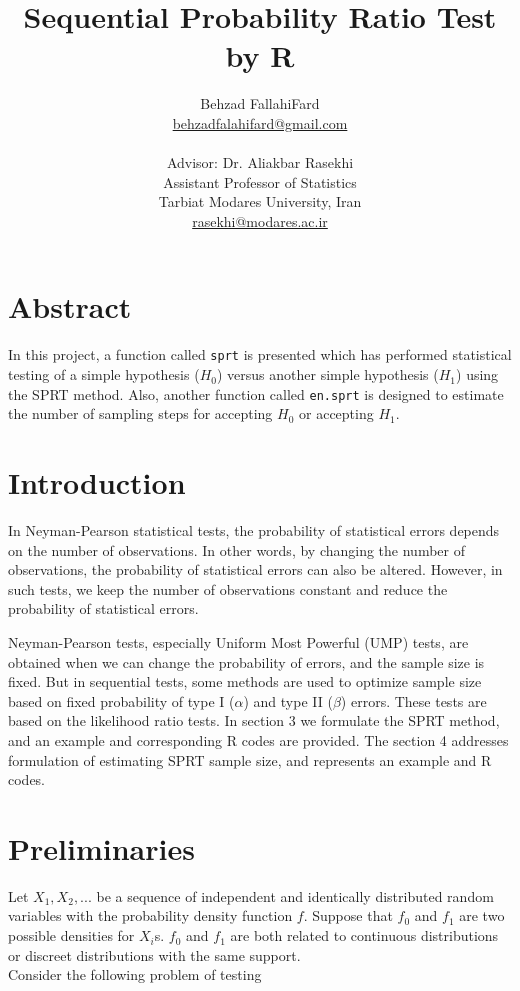 \documentclass{article}
\title{Sequential Probability Ratio Test by R}
\author{Behzad FallahiFard
\\ \href{mailto:behzadfalahifard@gmail.com}{behzadfalahifard@gmail.com}
\\ \\{\small Advisor: Dr. Aliakbar Rasekhi}\\ \small{Assistant Professor of Statistics}\\ {\small Tarbiat Modares University, Iran}
\\ \href{mailto:rasekhi@modares.ac.ir}{rasekhi@modares.ac.ir}}
\begin{document}
\maketitle

\section{Abstract}
In this project, a function called \texttt{sprt} is presented which has performed statistical testing of a simple hypothesis ($H_0$) versus another simple hypothesis ($H_1$) using the SPRT method. Also, another function called \texttt{en.sprt} is designed to estimate the number of sampling steps for accepting $H_0$ or accepting $H_1$.
\section{Introduction}
In Neyman-Pearson statistical tests, the probability of statistical errors depends on the number of observations. In other words, by changing the number of observations, the probability of statistical errors can also be altered. However, in such tests, we keep the number of observations constant and reduce the probability of statistical errors.


Neyman-Pearson tests, especially Uniform Most Powerful (UMP) tests, are obtained when we can change the probability of errors, and the sample size is fixed. But in sequential tests, some methods are used to optimize sample size based on fixed probability of type I ($\alpha$) and type II ($\beta$) errors. These tests are based on the likelihood ratio tests. In section 3 we formulate the SPRT method, and an example and corresponding R codes are provided. The section 4 addresses formulation of estimating SPRT sample size, and represents an example and  R codes.
\section{Preliminaries}
Let $X_1,X_2,...$ be a sequence of independent and identically distributed random variables with the probability density function $f$. Suppose that $f_0$ and $f_1$ are two possible densities for $X_i$s. $f_0$ and $f_1$ are both related to continuous distributions or discreet distributions with the same support.\\
Consider the following problem of testing
\end{document}

